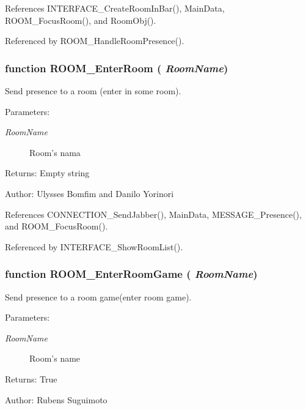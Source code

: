 References INTERFACE\_\-CreateRoomInBar(), MainData, ROOM\_\-FocusRoom(), and RoomObj().

Referenced by ROOM\_\-HandleRoomPresence().
\subsubsection[ROOM\_\-EnterRoom]{\setlength{\rightskip}{0pt plus 5cm}function ROOM\_\-EnterRoom ( {\em RoomName})}\label{room_2room_8js_bf1ecfaa126d14e1beffee4131c0f3b8}


Send presence to a room (enter in some room). 

\begin{Desc}
\item[Parameters:]
\begin{description}
\item[{\em RoomName}]Room's nama \end{description}
\end{Desc}
\begin{Desc}
\item[Returns:]Empty string \end{Desc}
\begin{Desc}
\item[Author:]Ulysses Bomfim and Danilo Yorinori \end{Desc}


References CONNECTION\_\-SendJabber(), MainData, MESSAGE\_\-Presence(), and ROOM\_\-FocusRoom().

Referenced by INTERFACE\_\-ShowRoomList().
\subsubsection[ROOM\_\-EnterRoomGame]{\setlength{\rightskip}{0pt plus 5cm}function ROOM\_\-EnterRoomGame ( {\em RoomName})}\label{room_2room_8js_3f6ec5d9a44f7bc914bf2b25eb786707}


Send presence to a room game(enter room game). 

\begin{Desc}
\item[Parameters:]
\begin{description}
\item[{\em RoomName}]Room's name \end{description}
\end{Desc}
\begin{Desc}
\item[Returns:]True \end{Desc}
\begin{Desc}
\item[Author:]Rubens Suguimoto \end{Desc}


